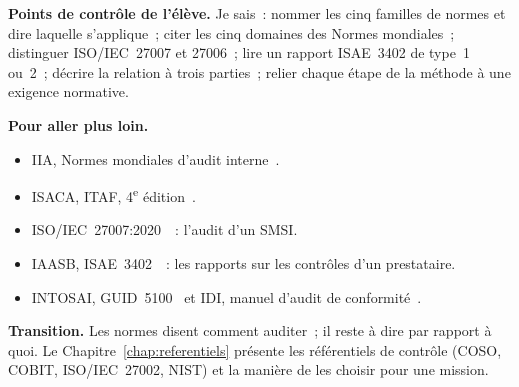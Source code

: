 \bigskip

\begin{boxinfo}
\textbf{Points de contrôle de l'élève.} Je sais~: nommer les cinq familles
de normes et dire laquelle s'applique~; citer les cinq domaines des Normes
mondiales~; distinguer ISO/IEC~27007 et 27006~; lire un rapport ISAE~3402
de type~1 ou~2~; décrire la relation à trois parties~; relier chaque étape
de la méthode à une exigence normative.
\end{boxinfo}

\begin{boxinfo}
\textbf{Pour aller plus loin.}
\begin{itemize}
    \item IIA, Normes mondiales d'audit interne~\cite{iia2024gias}.
    \item ISACA, ITAF, 4\textsuperscript{e} édition~\cite{isaca2020itaf}.
    \item ISO/IEC~27007:2020~\cite{iso27007_2020}~: l'audit d'un SMSI.
    \item IAASB, ISAE~3402~\cite{iaasb2011isae3402}~: les rapports sur les
          contrôles d'un prestataire.
    \item INTOSAI, GUID~5100~\cite{intosai2019guid5100} et IDI, manuel
          d'audit de conformité~\cite{idi2021conformite}.
\end{itemize}
\end{boxinfo}

\begin{boxinfo}
\textbf{Transition.} Les normes disent comment auditer~; il reste à dire
par rapport à quoi. Le Chapitre~\ref{chap:referentiels} présente les
référentiels de contrôle (COSO, COBIT, ISO/IEC~27002, NIST) et la manière
de les choisir pour une mission.
\end{boxinfo}
